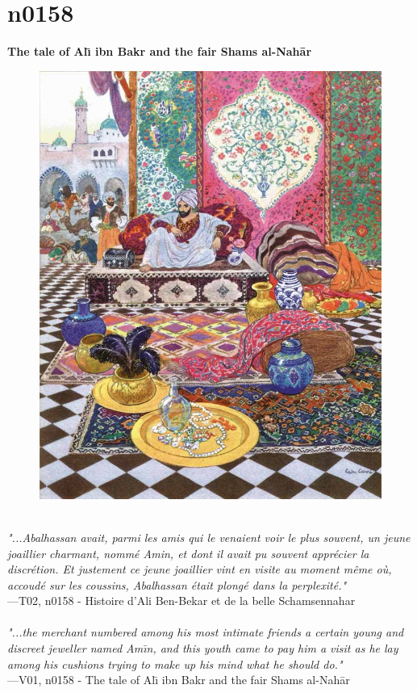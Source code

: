 \documentclass[../Carre_nights.tex]{subfiles}
\begin{document}
\newpage

\section{n0158}
\textbf{\Large{The tale of Al\={\i} ibn Bakr and the fair Shams al-Nah\=ar}} \\

\begin{figure}[ht]
\centering
\includegraphics[height=\figsize]{illustrations/volume_2/T02, n0158 - Histoire d'Ali Ben-Bekar et de la belle Schamsennahar.jpg}
\end{figure}

\textit{\\
"...Abalhassan avait, parmi les amis qui le venaient voir le plus souvent, un jeune joaillier charmant, nommé Amin, et dont il avait pu souvent apprécier la discrétion. Et justement ce jeune joaillier vint en visite au moment même où, accoudé sur les coussins, Abalhassan était plongé dans la perplexité."} \\
—T02, n0158 - Histoire d'Ali Ben-Bekar et de la belle Schamsennahar \\~\\
\textit{"...the merchant numbered among his most intimate friends a certain young and discreet jeweller named Am\={\i}n, and this youth came to pay him a visit as he lay among his cushions trying to make up his mind what he should do."} \\
—V01, n0158 - The tale of Al\={\i} ibn Bakr and the fair Shams al-Nah\=ar
\end{document}
